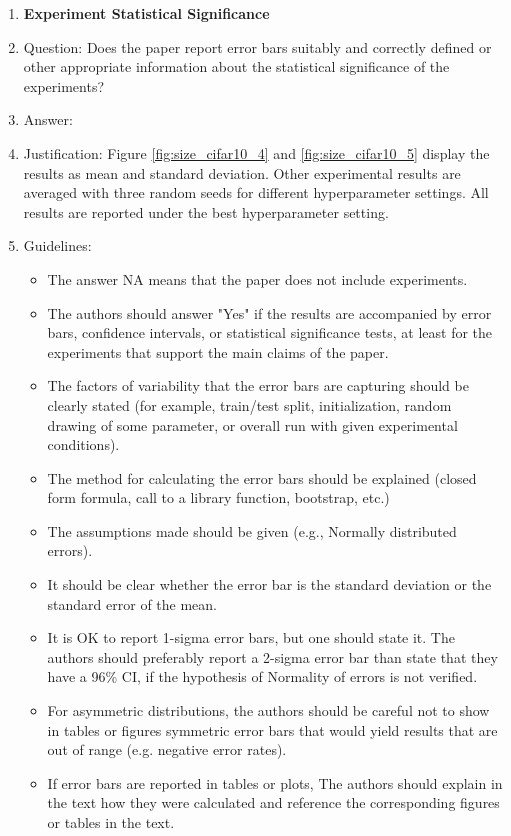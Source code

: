 \documentclass{article}
\theoremstyle{plain}
\theoremstyle{definition}
\theoremstyle{remark}
\begin{document}
\begin{enumerate}
\item {\bf Experiment Statistical Significance}
    \item[] Question: Does the paper report error bars suitably and correctly defined or other appropriate information about the statistical significance of the experiments?
    \item[] Answer: \answerYes{} %
    \item[] Justification: Figure \ref{fig:size_cifar10_4} and \ref{fig:size_cifar10_5} display the results as mean and standard deviation. Other experimental results are averaged with three random seeds for different hyperparameter settings. All results are reported under the best hyperparameter setting. 
    \item[] Guidelines:
    \begin{itemize}
        \item The answer NA means that the paper does not include experiments.
        \item The authors should answer "Yes" if the results are accompanied by error bars, confidence intervals, or statistical significance tests, at least for the experiments that support the main claims of the paper.
        \item The factors of variability that the error bars are capturing should be clearly stated (for example, train/test split, initialization, random drawing of some parameter, or overall run with given experimental conditions).
        \item The method for calculating the error bars should be explained (closed form formula, call to a library function, bootstrap, etc.)
        \item The assumptions made should be given (e.g., Normally distributed errors).
        \item It should be clear whether the error bar is the standard deviation or the standard error of the mean.
        \item It is OK to report 1-sigma error bars, but one should state it. The authors should preferably report a 2-sigma error bar than state that they have a 96\% CI, if the hypothesis of Normality of errors is not verified.
        \item For asymmetric distributions, the authors should be careful not to show in tables or figures symmetric error bars that would yield results that are out of range (e.g. negative error rates).
        \item If error bars are reported in tables or plots, The authors should explain in the text how they were calculated and reference the corresponding figures or tables in the text.
    \end{itemize}


\end{enumerate}
\end{document}

